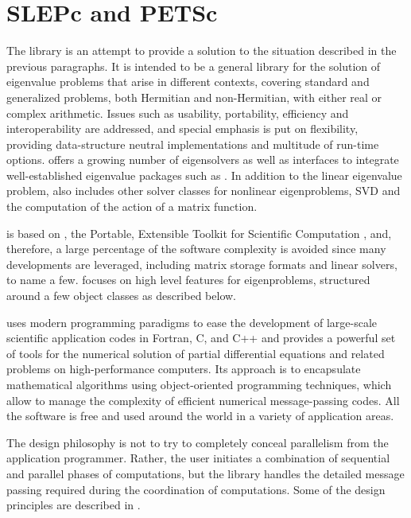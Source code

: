 \section{SLEPc and PETSc}

	The \slepc library is an attempt to provide a solution to the situation described in the previous paragraphs. It is intended to be a general library for the solution of eigenvalue problems that arise in different contexts, covering standard and generalized problems, both Hermitian and non-Hermitian, with either real or complex arithmetic. Issues such as usability, portability, efficiency and interoperability are addressed, and special emphasis is put on flexibility, providing data-structure neutral implementations and multitude of run-time options. \slepc offers a growing number of eigensolvers as well as interfaces to integrate well-established eigenvalue packages such as \arpack. In addition to the linear eigenvalue problem, \slepc also includes other solver classes for nonlinear eigenproblems, SVD and the computation of the action of a matrix function.

	\slepc is based on \petsc, the Portable, Extensible Toolkit for Scientific Computation \citep{Balay:2013:PUM}, and, therefore, a large percentage of the software complexity is avoided since many \petsc developments are leveraged, including matrix storage formats and linear solvers, to name a few. \slepc focuses on high level features for eigenproblems, structured around a few object classes as described below. 

	\petsc uses modern programming paradigms to ease the development of large-scale scientific application codes in Fortran, C, and C++ and provides a powerful set of tools for the numerical solution of partial differential equations and related problems on high-performance computers. Its approach is to encapsulate mathematical algorithms using object-oriented programming techniques, which allow to manage the complexity of efficient numerical message-passing codes. All the \petsc software is free and used around the world in a variety of application areas.

	The design philosophy is not to try to completely conceal parallelism from the application programmer. Rather, the user initiates a combination of sequential and parallel phases of computations, but the library handles the detailed message passing required during the coordination of computations. Some of the design principles are described in \citep{Balay:1997:EMP}.

